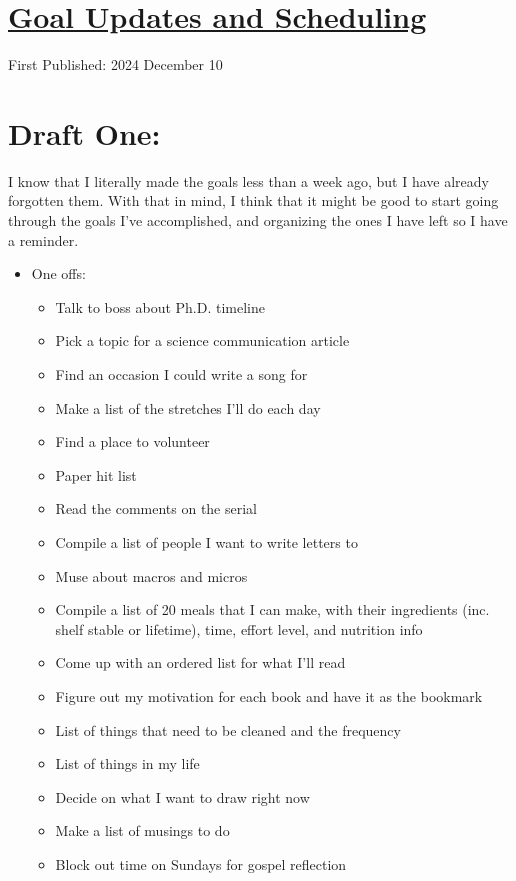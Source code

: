 \documentclass[12pt]{article}[titlepage]
\renewcommand{\,}{\textsuperscript{,}}
\begin{document}
\doublespacing
\section{\href{goal-updates.html}{Goal Updates and Scheduling}}
First Published: 2024 December 10

\section{Draft One:}
I know that I literally made the goals less than a week ago, but I have already forgotten them.  
With that in mind, I think that it might be good to start going through the goals I've accomplished, and organizing the ones I have left so I have a reminder.

\begin{itemize}  
\item One offs:  
\begin{itemize}  
\item Talk to boss about Ph.D. timeline  
\item Pick a topic for a science communication article  
\item Find an occasion I could write a song for  
\item Make a list of the stretches I'll do each day  
\item Find a place to volunteer  
\item Paper hit list  
\item Read the comments on the serial  
\item Compile a list of people I want to write letters to  
\item Muse about macros and micros  
\item Compile a list of 20 meals that I can make, with their ingredients (inc. shelf stable or lifetime), time, effort level, and nutrition info  
\item Come up with an ordered list for what I'll read  
\item Figure out my motivation for each book and have it as the bookmark  
\item List of things that need to be cleaned and the frequency  
\item List of things in my life  
\item Decide on what I want to draw right now  
\item Make a list of musings to do  
\item Block out time on Sundays for gospel reflection  
\end{itemize}  

\end{itemize}
\end{document}
